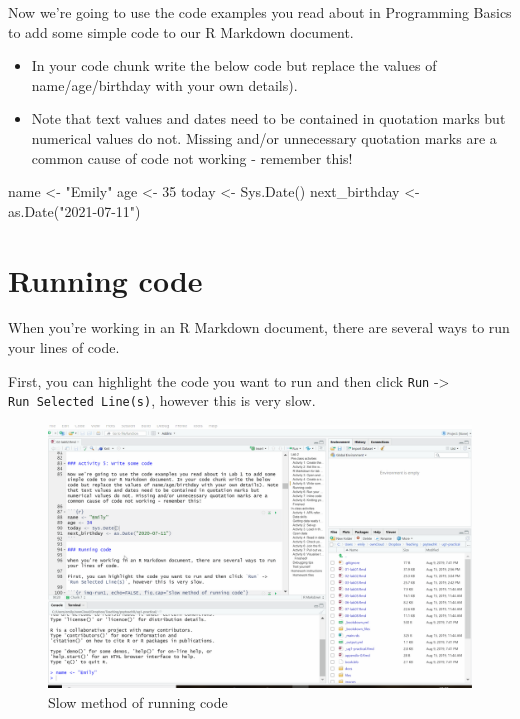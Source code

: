 \documentclass[
  oneside]{book}
\newenvironment{Shaded}{\begin{snugshade}}{\end{snugshade}}
\newcommand{\DecValTok}[1]{\textcolor[rgb]{0.00,0.00,0.81}{#1}}
\newcommand{\FunctionTok}[1]{\textcolor[rgb]{0.00,0.00,0.00}{#1}}
\newcommand{\NormalTok}[1]{#1}
\newcommand{\OtherTok}[1]{\textcolor[rgb]{0.56,0.35,0.01}{#1}}
\newcommand{\StringTok}[1]{\textcolor[rgb]{0.31,0.60,0.02}{#1}}
\providecommand{\tightlist}{%
  \setlength{\itemsep}{0pt}\setlength{\parskip}{0pt}}
\begin{document}
Now we're going to use the code examples you read about in Programming Basics to add some simple code to our R Markdown document.

\begin{itemize}
\tightlist
\item
  In your code chunk write the below code but replace the values of name/age/birthday with your own details).\\
\item
  Note that text values and dates need to be contained in quotation marks but numerical values do not. Missing and/or unnecessary quotation marks are a common cause of code not working - remember this!
\end{itemize}

\begin{Shaded}
\begin{Highlighting}[]
\NormalTok{name }\OtherTok{\textless{}{-}} \StringTok{"Emily"} 
\NormalTok{age }\OtherTok{\textless{}{-}} \DecValTok{35}
\NormalTok{today }\OtherTok{\textless{}{-}} \FunctionTok{Sys.Date}\NormalTok{()}
\NormalTok{next\_birthday }\OtherTok{\textless{}{-}} \FunctionTok{as.Date}\NormalTok{(}\StringTok{"2021{-}07{-}11"}\NormalTok{)}
\end{Highlighting}
\end{Shaded}

\hypertarget{running-code}{%
\section{Running code}\label{running-code}}

When you're working in an R Markdown document, there are several ways to run your lines of code.

First, you can highlight the code you want to run and then click \texttt{Run} -\textgreater{} \texttt{Run\ Selected\ Line(s)}, however this is very slow.

\begin{figure}

{\centering \includegraphics[width=1\linewidth]{images/run1} 

}

\caption{Slow method of running code}\label{fig:img-run1}
\end{figure}
\end{document}
